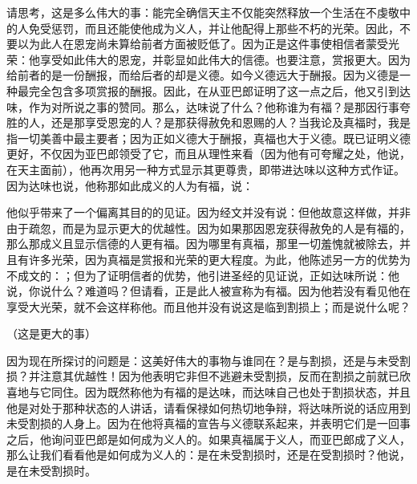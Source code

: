  \par

请思考，这是多么伟大的事：能完全确信天主不仅能突然释放一个生活在不虔敬中的人免受惩罚，而且还能使他成为义人，并让他配得上那些不朽的光荣。因此，不要以为此人在恩宠尚未算给前者方面被贬低了。因为正是这件事使相信者蒙受光荣：他享受如此伟大的恩宠，并彰显如此伟大的信德。也要注意，赏报更大。因为给前者的是一份酬报，而给后者的却是义德。如今义德远大于酬报。因为义德是一种最完全包含多项赏报的酬报。因此，在从亚巴郎证明了这一点之后，他又引到达味，作为对所说之事的赞同。那么，达味说了什么？他称谁为有福？是那因行事夸胜的人，还是那享受恩宠的人？是那获得赦免和恩赐的人？当我论及真福时，我是指一切美善中最主要者；因为正如义德大于酬报，真福也大于义德。既已证明义德更好，不仅因为亚巴郎领受了它，而且从理性来看（因为他有可夸耀之处，他说，在天主面前），他再次用另一种方式显示其更尊贵，即带进达味以这种方式作证。因为达味也说，他称那如此成义的人为有福，说：\par

 \par

他似乎带来了一个偏离其目的的见证。因为经文并没有说：但他故意这样做，并非由于疏忽，而是为显示更大的优越性。因为如果那因恩宠获得赦免的人是有福的，那么那成义且显示信德的人更有福。因为哪里有真福，那里一切羞愧就被除去，并且有许多光荣，因为真福是赏报和光荣的更大程度。为此，他陈述另一方的优势为不成文的：；但为了证明信者的优势，他引进圣经的见证说，正如达味所说：他说，你说什么？难道吗？但请看，正是此人被宣称为有福。因为他若没有看见他在享受大光荣，就不会这样称他。而且他并没有说这是临到割损上；而是说什么呢？\par

 （这是更大的事）\par

因为现在所探讨的问题是：这美好伟大的事物与谁同在？是与割损，还是与未受割损？并注意其优越性！因为他表明它非但不逃避未受割损，反而在割损之前就已欣喜地与它同住。因为既然称他为有福的是达味，而达味自己也处于割损状态，并且他是对处于那种状态的人讲话，请看保禄如何热切地争辩，将达味所说的话应用到未受割损的人身上。因为在他将真福的宣告与义德联系起来，并表明它们是一回事之后，他询问亚巴郎是如何成为义人的。如果真福属于义人，而亚巴郎成了义人，那么让我们看看他是如何成为义人的：是在未受割损时，还是在受割损时？他说，是在未受割损时。\par

